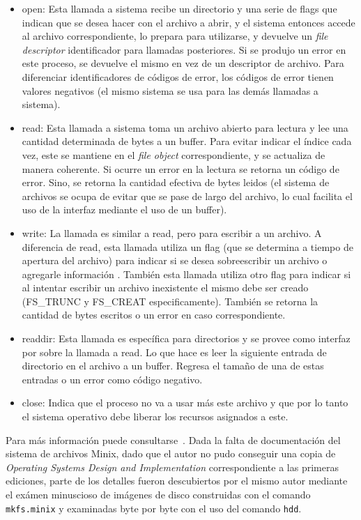 \begin{itemize}
	\item open: Esta llamada a sistema recibe un directorio y una serie de flags que indican que se desea hacer con el archivo a abrir,
	y el sistema entonces accede al archivo correspondiente, lo prepara para utilizarse, y devuelve un \textit{file descriptor} identificador
	para llamadas posteriores. Si se produjo un error en este proceso, se devuelve el mismo en vez de un descriptor de archivo. Para diferenciar
	identificadores de c\'odigos de error, los c\'odigos de error tienen valores negativos (el mismo sistema se usa para las dem\'as llamadas
	a sistema).

	\item read: Esta llamada a sistema toma un archivo abierto para lectura y lee una cantidad determinada de bytes a un buffer. Para evitar
	indicar el \'indice cada vez, este se mantiene en el \textit{file object} correspondiente, y se actualiza de manera coherente. Si ocurre
	un error en la lectura se retorna un c\'odigo de error. Sino, se retorna la cantidad efectiva de bytes leidos (el sistema de archivos se
	ocupa de evitar que se pase de largo del archivo, lo cual facilita el uso de la interfaz mediante el uso de un buffer).		

	\item write: La llamada es similar a read, pero para escribir a un archivo. A diferencia de read, esta llamada utiliza un flag (que se
	determina a tiempo de apertura del archivo) para indicar si se desea sobreescribir un archivo o agregarle informaci\'on . Tambi\'en esta
	llamada utiliza otro flag para indicar si al intentar escribir un archivo inexistente el mismo debe ser creado (FS\_TRUNC y FS\_CREAT
	especificamente). Tambi\'en se retorna la cantidad de bytes escritos o un error en caso correspondiente.

	\item readdir: Esta llamada es espec\'ifica para directorios y se provee como interfaz por sobre la llamada a read. Lo que hace es leer
	la siguiente entrada de directorio en el archivo a un buffer. Regresa el tama\~no de una de estas entradas o un error como c\'odigo negativo.

	\item close: Indica que el proceso no va a usar m\'as este archivo y que por lo tanto el sistema operativo debe liberar los recursos
	asignados a este.
\end{itemize}

Para m\'as informaci\'on puede consultarse~\cite{minixfs}. Dada la falta de documentaci\'on del sistema de archivos Minix, dado que el autor no pudo conseguir una copia de \textit{Operating Systems Design and Implementation} correspondiente a las primeras ediciones, parte de los detalles
fueron descubiertos por el mismo autor mediante el ex\'amen minuscioso de im\'agenes de disco construidas con el comando \texttt{mkfs.minix} y examinadas byte por byte con el uso del comando \texttt{hdd}.
